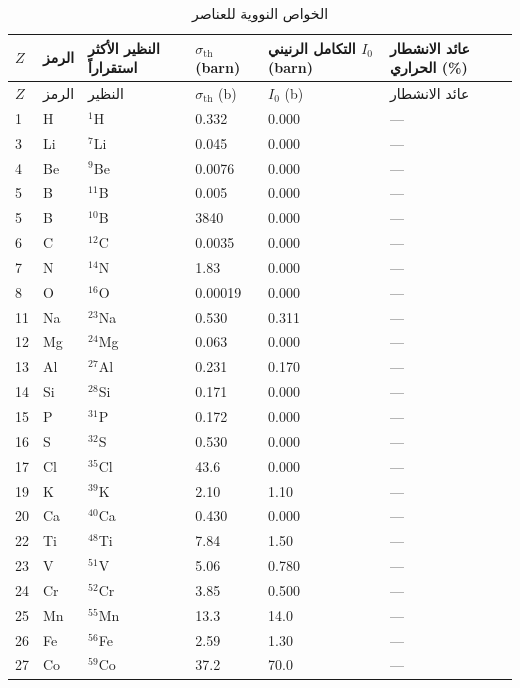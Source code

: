 \documentclass[11pt,a4paper]{article}
\begin{document}
\begin{otherlanguage}{arabic}
		\begin{longtable}{p{0.8cm}p{1.2cm}p{2.0cm}p{2.5cm}p{2.5cm}p{2.5cm}}
			\caption{الخواص النووية للعناصر} \label{tab:nuclear-properties-func} \\
			\toprule
			\(Z\) & الرمز & النظير الأكثر استقراراً & \(\sigma_{\text{th}}\) (barn) & التكامل الرنيني \(I_0\) (barn) & عائد الانشطار الحراري (\%) \\
			\midrule
			\endfirsthead
			\toprule
			\(Z\) & الرمز & النظير & \(\sigma_{\text{th}}\) (b) & \(I_0\) (b) & عائد الانشطار \\
			\midrule
			\endhead
			1  & H  & \(^{1}\)H & 0.332 & 0.000 & --- \\
			3  & Li & \(^{7}\)Li & 0.045 & 0.000 & --- \\
			4  & Be & \(^{9}\)Be & 0.0076 & 0.000 & --- \\
			5  & B  & \(^{11}\)B & 0.005 & 0.000 & --- \\
			5  & B  & \(^{10}\)B & 3840 & 0.000 & --- \\
			6  & C  & \(^{12}\)C & 0.0035 & 0.000 & --- \\
			7  & N  & \(^{14}\)N & 1.83 & 0.000 & --- \\
			8  & O  & \(^{16}\)O & 0.00019 & 0.000 & --- \\
			11 & Na & \(^{23}\)Na & 0.530 & 0.311 & --- \\
			12 & Mg & \(^{24}\)Mg & 0.063 & 0.000 & --- \\
			13 & Al & \(^{27}\)Al & 0.231 & 0.170 & --- \\
			14 & Si & \(^{28}\)Si & 0.171 & 0.000 & --- \\
			15 & P  & \(^{31}\)P & 0.172 & 0.000 & --- \\
			16 & S  & \(^{32}\)S & 0.530 & 0.000 & --- \\
			17 & Cl & \(^{35}\)Cl & 43.6 & 0.000 & --- \\
			19 & K  & \(^{39}\)K & 2.10 & 1.10 & --- \\
			20 & Ca & \(^{40}\)Ca & 0.430 & 0.000 & --- \\
			22 & Ti & \(^{48}\)Ti & 7.84 & 1.50 & --- \\
			23 & V  & \(^{51}\)V & 5.06 & 0.780 & --- \\
			24 & Cr & \(^{52}\)Cr & 3.85 & 0.500 & --- \\
			25 & Mn & \(^{55}\)Mn & 13.3 & 14.0 & --- \\
			26 & Fe & \(^{56}\)Fe & 2.59 & 1.30 & --- \\
			27 & Co & \(^{59}\)Co & 37.2 & 70.0 & --- \\

\end{longtable}
\end{otherlanguage}
\end{document}
